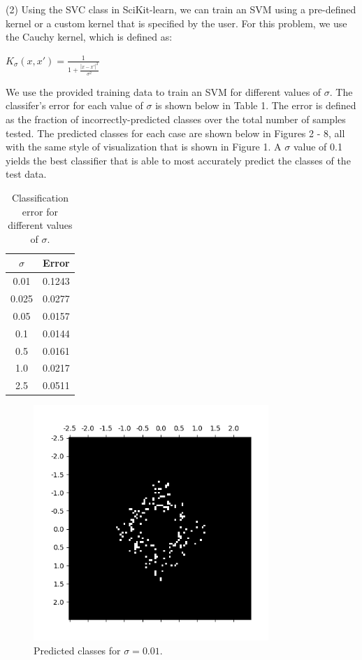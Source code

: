 (2) Using the SVC class in SciKit-learn, we can train an SVM using a pre-defined kernel or a custom kernel that is specified by the user. For this problem, we use the Cauchy kernel, which is defined as:
\begin{center}
    \large{$K_{\sigma}(x, x') = \frac{1}{1 + \frac{|x - x'|^{2}}{\sigma^{2}}}$}
\end{center}
We use the provided training data to train an SVM for different values of $\sigma$. The classifer's error for each value of $\sigma$ is shown below in Table 1. The error is defined as the fraction of incorrectly-predicted classes over the total number of samples tested. The predicted classes for each case are shown below in Figures 2 - 8, all with the same style of visualization that is shown in Figure 1. A $\sigma$ value of 0.1 yields the best classifier that is able to most accurately predict the classes of the test data.
\begin{table}[h]
\centering
 \begin{tabular}{||c c||} 
 \hline
 $\sigma$ & Error \\ [0.5ex] 
 \hline\hline
0.01 & 0.1243 \\
0.025 & 0.0277 \\
0.05 & 0.0157 \\
0.1 & 0.0144 \\
0.5 & 0.0161 \\
1.0 & 0.0217 \\
2.5 & 0.0511 \\ [0.5ex] 
 \hline
 \end{tabular}
 \caption{Classification error for different values of $\sigma$.}
\label{table:1}
\end{table}
\begin{figure}[h]
    \centering
    \includegraphics[height=3.5in]{Figure_2_1.png}
    \caption{Predicted classes for $\sigma = 0.01$.}
\end{figure}
